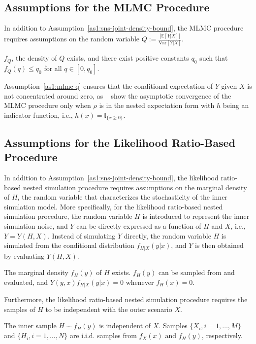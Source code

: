 \subsection{Assumptions for the MLMC Procedure}
In addition to Assumption~\ref{as1:sns-joint-density-bound}, the MLMC procedure requires assumptions on the random variable $Q:= \frac{|\mathbb{E} \left[ Y | X \right]|}{\text{Var}[Y|X]}$.

\begin{assumption} \label{as1:mlmc-q}
    $f_Q$, the density of $Q$ exists, and there exist positive constants $q_0$ such that $f_Q(q) \leq q_0$ for all $q \in [0, q_0]$.
\end{assumption}

Assumption~\ref{as1:mlmc-q} ensures that the conditional expectation of $Y$ given $X$ is not concentrated around zero, as ~\cite{giles2019multilevel} show the asymptotic convergence of the MLMC procedure only when $\rho$ is in the nested expectation form with $h$ being an indicator function, i.e., $h(x) = \mathbb{I}_{\{x \geq 0\}}$.

\subsection{Assumptions for the Likelihood Ratio-Based Procedure}
In addition to Assumption~\ref{as1:sns-joint-density-bound}, the likelihood ratio-based nested simulation procedure requires assumptions on the marginal density of $H$, the random variable that characterizes the stochasticity of the inner simulation model.
More specifically, for the likelihood ratio-based nested simulation procedure, the random variable $H$ is introduced to represent the inner simulation noise, and $Y$ can be directly expressed as a function of $H$ and $X$, i.e., $Y = Y(H, X)$.
Instead of simulating $Y$ directly, the random variable $H$ is simulated from the conditional distribution $f_{H|X}(y|x)$, and $Y$ is then obtained by evaluating $Y(H, X)$.

\begin{assumption} \label{as1:likelihood-ratio-marginal-density}
    The marginal density $f_H(y)$ of $H$ exists. $f_H(y)$ can be sampled from and evaluated, and $Y(y, x) f_{H|X}(y|x) = 0$ whenever $f_H(x) = 0$. 
\end{assumption}

Furthermore, the likelihood ratio-based nested simulation procedure requires the samples of $H$ to be independent with the outer scenario $X$.

\begin{assumption} \label{as1:likelihood-ratio-independence}
    The inner sample $H \sim f_H(y)$ is independent of $X$. Samples $\{X_i, i=1,\ldots,M\}$ and $\{H_i, i=1,\ldots,N\}$ are i.i.d. samples from $f_X(x)$ and $f_H(y)$, respectively.
\end{assumption}

